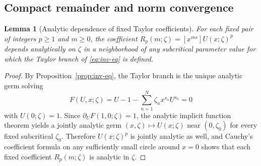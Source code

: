 \documentclass[11pt]{amsart}
\numberwithin{equation}{section}
\theoremstyle{plain}
\newtheorem{lemma}[theorem]{Lemma}
\theoremstyle{definition}
\theoremstyle{remark}
\begin{document}
\subsection{Compact remainder and norm convergence}
\label{app:compact-remainder}

\begin{lemma}[Analytic dependence of fixed Taylor coefficients]
\label{lem:fixed-coeff-analytic}
For each fixed pair of integers $p\ge 1$ and $m\ge 0$, the coefficient
$R_p(m;\zeta)=[x^{ms}]U(x;\zeta)^p$ depends analytically on \(\zeta\) in a
neighborhood of any subcritical parameter value for which the Taylor branch of
\eqref{eq:inv-eq} is defined.
\end{lemma}

\begin{proof}
By Proposition~\ref{prop:inv-eq}, the Taylor branch is the unique analytic germ
solving
\[
F(U,x;\zeta)=U-1-\sum_{n=1}^N \zeta_n x^{s_n}U^{s_n}=0
\]
with $U(0;\zeta)=1$. Since $\partial_U F(1,0;\zeta)=1$, the analytic implicit
function theorem yields a jointly analytic germ \((x,\zeta)\mapsto U(x;\zeta)\)
near \((0,\zeta_0)\) for every fixed subcritical \(\zeta_0\). Therefore
$U(x;\zeta)^p$ is jointly analytic as well, and Cauchy's coefficient formula on
any sufficiently small circle around $x=0$ shows that each fixed coefficient
$R_p(m;\zeta)$ is analytic in \(\zeta\).
\end{proof}
\end{document}
